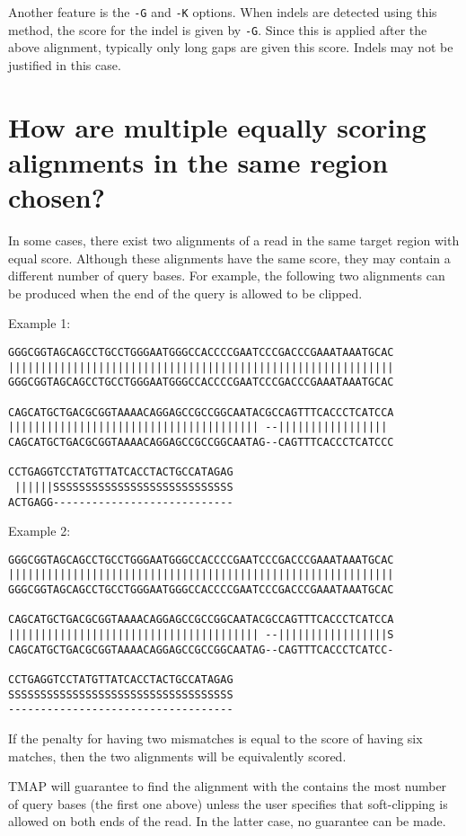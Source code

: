 \documentclass[a4paper,12pt]{book}
\newcommand{\TT}[1]{{\tt #1}} %
\begin{document}
Another feature is the \TT{-G} and \TT{-K} options.
When indels are detected using this method, the score for the indel is given by \TT{-G}.
Since this is applied after the above alignment, typically only long gaps are given this score.
Indels may not be justified in this case.

\section{How are multiple equally scoring alignments in the same region chosen?}

In some cases, there exist two alignments of a read in the same target region with equal score. 
Although these alignments have the same score, they may contain a different number of query bases.
For example, the following two alignments can be produced when the end of the query is allowed to be clipped. 

Example 1:
\begin{verbatim}
GGGCGGTAGCAGCCTGCCTGGGAATGGGCCACCCCGAATCCCGACCCGAAATAAATGCAC
||||||||||||||||||||||||||||||||||||||||||||||||||||||||||||
GGGCGGTAGCAGCCTGCCTGGGAATGGGCCACCCCGAATCCCGACCCGAAATAAATGCAC

CAGCATGCTGACGCGGTAAAACAGGAGCCGCCGGCAATACGCCAGTTTCACCCTCATCCA
||||||||||||||||||||||||||||||||||||||| --||||||||||||||||| 
CAGCATGCTGACGCGGTAAAACAGGAGCCGCCGGCAATAG--CAGTTTCACCCTCATCCC

CCTGAGGTCCTATGTTATCACCTACTGCCATAGAG
 ||||||SSSSSSSSSSSSSSSSSSSSSSSSSSSS
ACTGAGG----------------------------
\end{verbatim}

Example 2:
\begin{verbatim}
GGGCGGTAGCAGCCTGCCTGGGAATGGGCCACCCCGAATCCCGACCCGAAATAAATGCAC
||||||||||||||||||||||||||||||||||||||||||||||||||||||||||||
GGGCGGTAGCAGCCTGCCTGGGAATGGGCCACCCCGAATCCCGACCCGAAATAAATGCAC

CAGCATGCTGACGCGGTAAAACAGGAGCCGCCGGCAATACGCCAGTTTCACCCTCATCCA
||||||||||||||||||||||||||||||||||||||| --|||||||||||||||||S
CAGCATGCTGACGCGGTAAAACAGGAGCCGCCGGCAATAG--CAGTTTCACCCTCATCC-

CCTGAGGTCCTATGTTATCACCTACTGCCATAGAG
SSSSSSSSSSSSSSSSSSSSSSSSSSSSSSSSSSS
-----------------------------------
\end{verbatim}

If the penalty for having two mismatches is equal to the score of having six matches, then the two alignments will be equivalently scored.

TMAP will guarantee to find the alignment with the contains the most number of query bases (the first one above) unless the user specifies that soft-clipping is allowed on both ends of the read.
In the latter case, no guarantee can be made.
\end{document}

